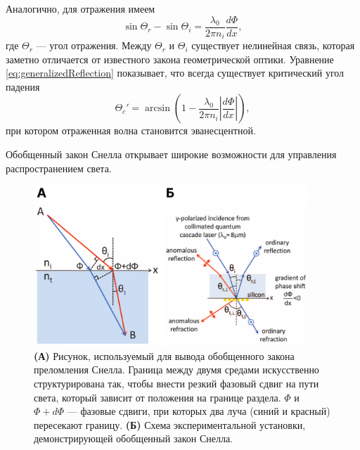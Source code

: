 Аналогично, для отражения имеем
\begin{equation}
    \label{eq:generalizedReflection}
    \sin\Theta_r - \sin\Theta_i = \frac{\lambda_0}{2\pi n_i}\frac{d\Phi}{dx},
\end{equation}
где $\Theta_r$ --- угол отражения. Между $\Theta_r$ и $\Theta_i$ существует нелинейная связь, которая заметно отличается от известного закона геометрической оптики. Уравнение \eqref{eq:generalizedReflection} показывает, что всегда существует критический угол падения
\begin{equation}
    \Theta_c' = \arcsin\left(1 - \frac{\lambda_0}{2\pi n_i}\left|\frac{d\Phi}{dx}\right|\right),
\end{equation}
при котором отраженная волна становится эванесцентной.

Обобщенный закон Снелла открывает широкие возможности для управления распространением света.

\begin{figure}
    \begin{center}
        \includegraphics[width=0.92\textwidth]{pictures/Generalized_Snell's_law.png}
        \caption{\textbf{(А)} Рисунок, используемый для вывода обобщенного закона преломления Снелла. Граница между двумя средами искусственно структурирована так, чтобы внести резкий фазовый сдвиг на пути света, который зависит от положения на границе раздела. $\Phi$ и $\Phi + d\Phi$ — фазовые сдвиги, при которых два луча (синий и красный) пересекают границу.\cite[Fig. 1]{generalized2011} \textbf{(Б)} Схема экспериментальной установки, демонстрирующей обобщенный закон Снелла.\cite[Fig. 3B]{generalized2011}}
    \end{center}
    \label{fig:generalized}
\end{figure}

